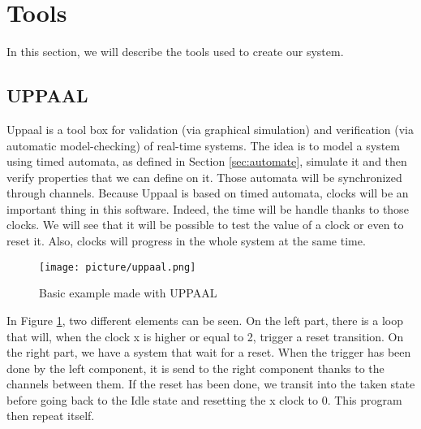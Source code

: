 \section{Tools}
In this section, we will describe the tools used to create our system.

\subsection{UPPAAL}
Uppaal is a tool box for validation (via graphical simulation) and verification (via automatic model-checking) of real-time systems. The idea is to model a system using timed automata, as defined in Section \ref{sec:automate}, simulate it and then verify properties that we can define on it. Those automata will be synchronized through channels. Because Uppaal is based on timed automata, clocks will be an important thing in this software. Indeed, the time will be handle thanks to those clocks. We will see that it will be possible to test the value of a clock or even to reset it. Also, clocks will progress in the whole system at the same time.
\begin{figure}[H]\label{fig:uppaal}
  \begin{center}
    \texttt{[image: picture/uppaal.png]}
    \caption{Basic example made with UPPAAL}
  \end{center}
\end{figure}
 In Figure \ref{fig:uppaal}, two different elements can be seen. On the left part, there is a loop that will, when the clock x is higher or equal to 2, trigger a reset transition. On the right part, we have a system that wait for a reset. When the trigger has been done by the left component, it is send to the right component thanks to the channels between them. If the reset has been done, we transit into the taken state before going back to the Idle state and resetting the x clock to 0. This program then repeat itself.
 
